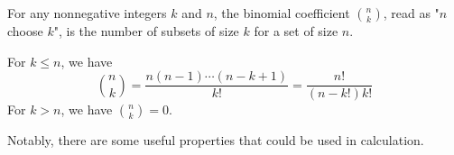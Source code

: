 \begin{thm}
    For any nonnegative integers $k$ and $n$, the binomial coefficient $\binom{n}{k}$, read as "$n$ choose $k$", is the number of subsets of size $k$ for a set of size $n$.  
\end{thm}

\begin{defn}
    For $k\leq n$, we have
    $$
    \binom{n}{k} = \frac{n(n-1)\cdots(n-k+1)}{k!} = \frac{n!}{(n-k!)k!}
    $$
    For $k>n$, we have $\binom{n}{k}=0$.  
\end{defn}

Notably, there are some useful properties that could be used in calculation.